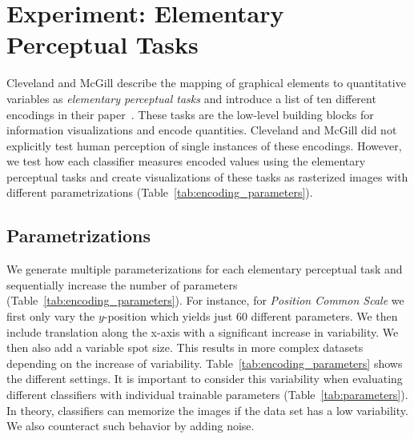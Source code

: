 \section{Experiment: Elementary Perceptual Tasks}

Cleveland and McGill describe the mapping of graphical elements to quantitative variables as \emph{elementary perceptual tasks} and introduce a list of ten different encodings in their paper~\cite{cleveland_mcgill,cleveland1985graphical}. These tasks are the low-level building blocks for information visualizations and encode quantities. Cleveland and McGill did not explicitly test human perception of single instances of these encodings. However, we test how each classifier measures encoded values using the elementary perceptual tasks and create visualizations of these tasks as rasterized images with different parametrizations (Table~\ref{tab:encoding_parameters}).

\subsection{Parametrizations}
\label{sec:parametrizations}
We generate multiple parameterizations for each elementary perceptual task and sequentially increase the number of parameters (Table~\ref{tab:encoding_parameters}). For instance, for \emph{Position Common Scale} we first only vary the $y$-position which yields just $60$ different parameters. We then include translation along the x-axis with a significant increase in variability. We then also add a variable spot size. This results in more complex datasets depending on the increase of variability. Table~\ref{tab:encoding_parameters} shows the different settings. It is important to consider this variability when evaluating different classifiers with individual trainable parameters (Table~\ref{tab:parameters}). In theory, classifiers can memorize the images if the data set has a low variability. We also counteract such behavior by adding noise.

